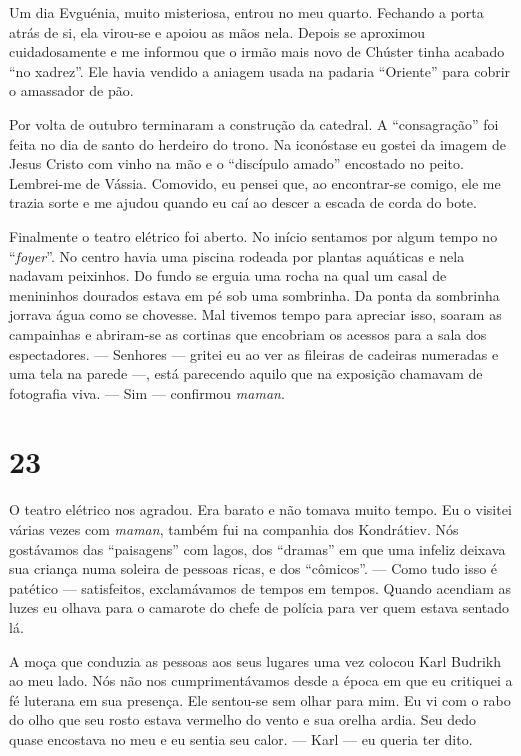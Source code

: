 Um dia Evguénia, muito misteriosa, entrou no meu quarto. Fechando a
porta atrás de si, ela virou-se e apoiou as mãos nela. Depois se
aproximou cuidadosamente e me informou que o irmão mais novo de Chúster
tinha acabado ``no xadrez''. Ele havia vendido a aniagem usada na
padaria ``Oriente'' para cobrir o amassador de pão.

Por volta de outubro terminaram a construção da catedral. A
``consagração'' foi feita no dia de santo do herdeiro do trono. Na
iconóstase eu gostei da imagem de Jesus Cristo com vinho na mão e o
``discípulo amado'' encostado no peito. Lembrei-me de Vássia. Comovido,
eu pensei que, ao encontrar-se comigo, ele me trazia sorte e me ajudou
quando eu caí ao descer a escada de corda do bote.

Finalmente o teatro elétrico foi aberto. No início sentamos por algum
tempo no ``\emph{foyer}''. No centro havia uma piscina rodeada por
plantas aquáticas e nela nadavam peixinhos. Do fundo se erguia uma rocha
na qual um casal de menininhos dourados estava em pé sob uma sombrinha.
Da ponta da sombrinha jorrava água como se chovesse. Mal tivemos tempo
para apreciar isso, soaram as campainhas e abriram-se as cortinas que
encobriam os acessos para a sala dos espectadores. --- Senhores ---
gritei eu ao ver as fileiras de cadeiras numeradas e uma tela na parede
---, está parecendo aquilo que na exposição chamavam de fotografia viva.
--- Sim --- confirmou \emph{maman}.

\section{23}

O teatro elétrico nos agradou. Era barato e não tomava muito tempo. Eu o
visitei várias vezes com \emph{maman}, também fui na companhia dos
Kondrátiev. Nós gostávamos das ``paisagens'' com lagos, dos ``dramas''
em que uma infeliz deixava sua criança numa soleira de pessoas ricas, e
dos ``cômicos''. --- Como tudo isso é patético --- satisfeitos,
exclamávamos de tempos em tempos. Quando acendiam as luzes eu olhava
para o camarote do chefe de polícia para ver quem estava sentado lá.

A moça que conduzia as pessoas aos seus lugares uma vez colocou Karl
Budrikh ao meu lado. Nós não nos cumprimentávamos desde a época em que
eu critiquei a fé luterana em sua presença. Ele sentou-se sem olhar para
mim. Eu vi com o rabo do olho que seu rosto estava vermelho do vento e
sua orelha ardia. Seu dedo quase encostava no meu e eu sentia seu calor.
--- Karl --- eu queria ter dito.

